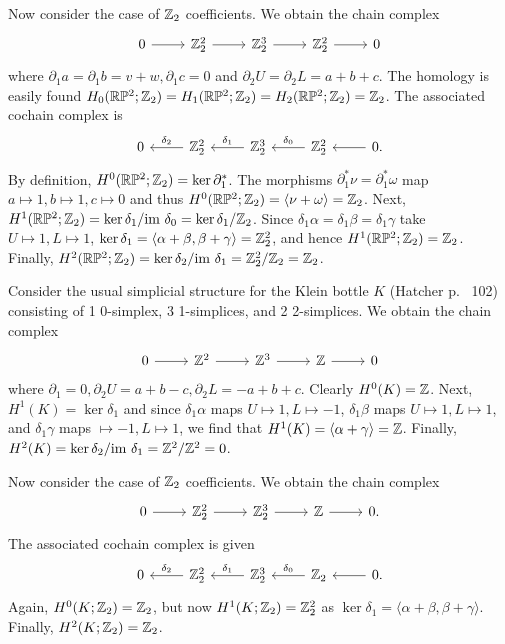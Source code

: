 \documentclass{../mathnotes}
\begin{document}
Now consider the case of $\mathbb{Z}_2$ coefficients. We obtain the chain complex
\begin{equation*}
    \begin{tikzcd}
        0\ar{r} & \Z_2^2\ar{r} & \Z_2^3\ar{r} & \Z_2^2\ar{r} & 0
    \end{tikzcd}
\end{equation*}
where $\partial_1a=\partial_1b=v+w,\partial_1c=0$ and $\partial_2U=\partial_2L=a+b+c$. The homology is easily
found $H_0(\mathbb{R}\mathbb{P}^2;\mathbb{Z}_2)=H_1(\mathbb{R}\mathbb{P}^2;\mathbb{Z}_2)=H_2(\mathbb{R}\mathbb{P}^2;\mathbb{Z}_2)=\mathbb{Z}_2$. The associated cochain complex is
\begin{equation*}
    \begin{tikzcd}
        0 & \Z_2^2\ar[swap]{l}{\delta_2} & \Z_2^3\ar[swap]{l}{\delta_1} & \Z_2^2\ar[swap]{l}{\delta_0} & 0\ar{l}.
    \end{tikzcd}
\end{equation*}
By definition, $H^0(\mathbb{R}\mathbb{P}^2;\mathbb{Z}_2)=\ker\partial_1^*$. The morphisms $\partial_1^*\nu=\partial_1^*\omega$ map
$a\mapsto 1,b\mapsto 1,c\mapsto 0$ and thus $H^0(\mathbb{R}\mathbb{P}^2;\mathbb{Z}_2)=\langle\nu+\omega\rangle=\mathbb{Z}_2$. Next,
$H^1(\mathbb{R}\mathbb{P}^2;\mathbb{Z}_2)=\ker\delta_1/\text{im }\delta_0=\ker\delta_1/\mathbb{Z}_2$. Since $\delta_1\alpha=\delta_1\beta=\delta_1\gamma$
take $U\mapsto 1,L\mapsto 1$, $\ker\delta_1=\langle\alpha+\beta,\beta+\gamma\rangle=\mathbb{Z}_2^2$, and hence
$H^1(\mathbb{R}\mathbb{P}^2;\mathbb{Z}_2)=\mathbb{Z}_2$. Finally, $H^2(\mathbb{R}\mathbb{P}^2;\mathbb{Z}_2)=\ker\delta_2/\text{im }\delta_1=\mathbb{Z}_2^2/\mathbb{Z}_2=\mathbb{Z}_2$.

Consider the usual simplicial structure for the Klein bottle $K$ (Hatcher p.~ 102) consisting
of 1 0-simplex, 3 1-simplices, and 2 2-simplices. We obtain the chain complex
\begin{equation*}
    \begin{tikzcd}
        0\ar{r} & \Z^2\ar{r} & \Z^3\ar{r} & \Z\ar{r} & 0
    \end{tikzcd}
\end{equation*}
where $\partial_1=0,\partial_2U=a+b-c,\partial_2L=-a+b+c$. Clearly $H^0(K)=\mathbb{Z}$. Next, $H^1(K)=\ker\delta_1$ and since
$\delta_1\alpha$ maps $U\mapsto 1,L\mapsto -1$, $\delta_1\beta$ maps $U\mapsto 1,L\mapsto 1$, and $\delta_1\gamma$ maps
$\mapsto -1,L\mapsto 1$, we find that $H^1(K)=\langle \alpha+\gamma\rangle=\mathbb{Z}$. Finally, $H^2(K)=\ker\delta_2/\text{im }\delta_1=\mathbb{Z}^2/\mathbb{Z}^2=0$.

Now consider the case of $\mathbb{Z}_2$ coefficients. We obtain the chain complex
\begin{equation*}
    \begin{tikzcd}
        0\ar{r} & \Z_2^2\ar{r} & \Z_2^3\ar{r} & \Z\ar{r} & 0.
    \end{tikzcd}
\end{equation*}
The associated cochain complex is given
\begin{equation*}
    \begin{tikzcd}
        0 & \Z_2^2\ar[swap]{l}{\delta_2} & \Z_2^3\ar[swap]{l}{\delta_1} & \Z_2\ar[swap]{l}{\delta_0} & 0\ar{l}.
    \end{tikzcd}
\end{equation*}
Again, $H^0(K;\mathbb{Z}_2)=\mathbb{Z}_2$, but now $H^1(K;\mathbb{Z}_2)=\mathbb{Z}_2^2$ as $\ker\delta_1=\langle\alpha+\beta,\beta+\gamma\rangle$.
Finally, $H^2(K;\mathbb{Z}_2)=\mathbb{Z}_2$.
\end{document}
